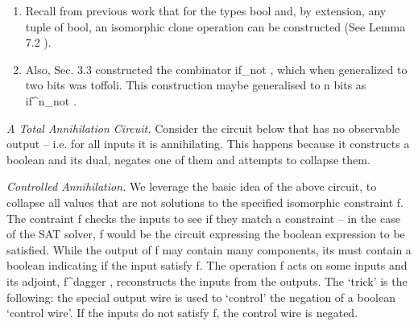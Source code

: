 \documentclass[preprint]{sigplanconf}
\begin{document}
\begin{enumerate}
\item Recall from previous work that for the types {{bool}} and, by
  extension, any tuple of {{bool}}, an isomorphic clone operation can
  be constructed (See Lemma 7.2 \cite{infeffects}).

\item Also, Sec. 3.3 \cite{infeffects} constructed the combinator
  {{if_{not} }}, which when generalized to two bits was
  {{toffoli}}. This construction maybe generalised to {{n}} bits as
  {{if^n_{not} }}.
\end{enumerate}


\emph{A Total Annihilation Circuit.}  Consider the circuit below that
has no observable output -- i.e. for all inputs it is
annihilating. This happens because it constructs a boolean and its
dual, negates one of them and attempts to collapse them.

\begin{center}
\end{center}

\emph{Controlled Annihilation.}
We leverage the basic idea of the above circuit, to collapse all
values that are not solutions to the specified isomorphic constraint
{{f}}. The contraint {{f}} checks the inputs to see if they match a
constraint -- in the case of the SAT solver, {{f}} would be the
circuit expressing the boolean expression to be satisfied.  While the
output of {{f}} may contain many components, its must contain a
boolean indicating if the input satisfy {{f}}. The operation {{f}}
acts on some inputs and its adjoint, {{f^{dagger} }}, reconstructs the
inputs from the outputs.  The `trick' is the following: the special
output wire is used to `control' the negation of a boolean `control
wire'.  If the inputs do not satisfy {{f}}, the control wire is
negated.

\begin{center}
\end{center}  
\end{document}
